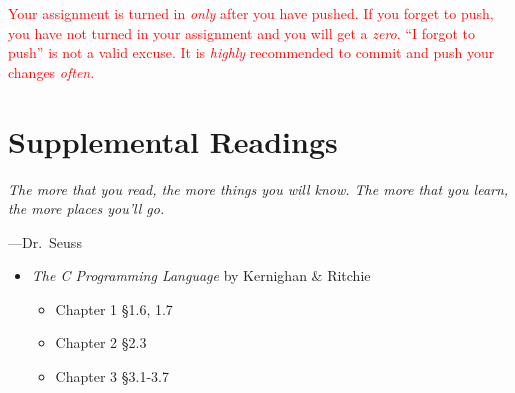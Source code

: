 \documentclass{article}
\begin{document}
\textcolor{red}{Your assignment is turned in \emph{only} after you have pushed.
If you forget to push, you have not turned in your assignment and you will get
a \emph{zero}. ``I forgot to push'' is not a valid excuse. It is \emph{highly} recommended to commit and push your changes \emph{often}.}

\section{Supplemental Readings}
\epigraph{\emph{The more that you read, the more things you will know. The
more that you learn, the more places you'll go.}}{---Dr.\ Seuss}\noindent

 \begin{itemize}

 	\item \textit{The C Programming Language} by Kernighan \& Ritchie
	\begin{itemize}
		\item Chapter 1 \S 1.6, 1.7
		\item Chapter 2 \S 2.3
		\item Chapter 3 \S 3.1-3.7
	\end{itemize}
 \end{itemize}


\newpage
\end{document}

